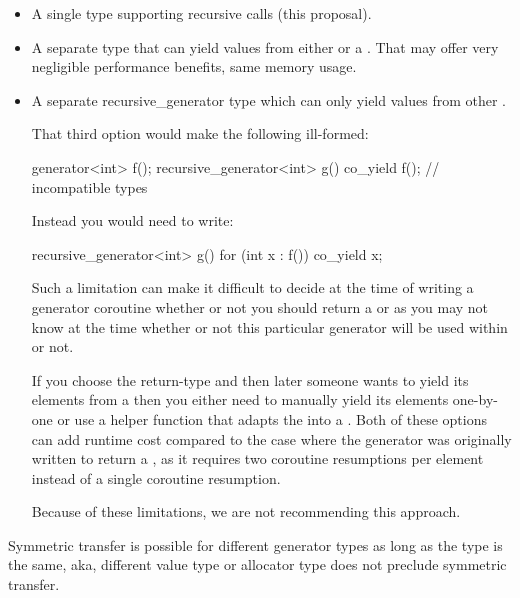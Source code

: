\documentclass{wg21}
\begin{document}
\begin{itemize}
    \item A single  type supporting recursive calls (this proposal).
    
    \item A separate type  that can yield values from either  or a . That may offer very negligible performance benefits, same memory usage.
    
    \item A separate {recursive_generator} type which can only yield values from other . 
    
    That third option would make the following ill-formed:
    
    \begin{colorblock}
        generator<int> f();
        recursive_generator<int> g() {
            co_yield f(); // incompatible types
        }
    \end{colorblock}
    
    Instead you would need to write:
    \begin{colorblock}
        recursive_generator<int> g() {
            for (int x : f()) co_yield x;
        }
    \end{colorblock}
    
    Such a limitation can make it difficult to decide at the time of writing a generator
    coroutine whether or not you should return a  or 
    as you may not know at the time whether or not this particular generator will be used
    within  or not.
    
    If you choose the  return-type and then later someone wants to yield its
    elements from a  then you either need to manually yield its
    elements one-by-one or use a helper function that adapts the  into a
    . Both of these options can add runtime cost compared to the case where the generator was originally written to return a ,
    as it requires two coroutine resumptions per element instead of a single coroutine resumption.
    
    Because of these limitations, we are not recommending this approach.
\end{itemize}

Symmetric transfer is possible for different generator types as long as the  type is the same, aka,
different value type or allocator type does not preclude symmetric transfer.
\end{document}
